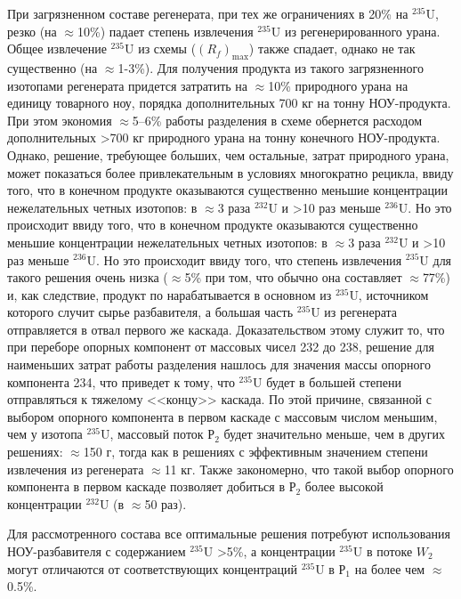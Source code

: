 При загрязненном составе регенерата, при тех же ограничениях в 20\% на $^{235}$U, резко (на $\approx$10\%) падает степень извлечения $^{235}$U из регенерированного урана. Общее извлечение  $^{235}$U из схемы ($(R_f)_\text{max}$) также спадает, однако не так существенно (на $\approx$1-3\%). Для получения продукта из такого загрязненного изотопами регенерата придется затратить на $\approx$10\% природного урана на единицу товарного ноу, порядка дополнительных 700 кг на тонну НОУ-продукта. При этом экономия $\approx$5--6\% работы разделения в схеме обернется расходом дополнительных >700 кг природного урана на тонну конечного НОУ-продукта. Однако, решение, требующее больших, чем остальные, затрат природного урана, может показаться более привлекательным в условиях многократно рецикла, ввиду того, что в конечном продукте оказываются существенно меньшие концентрации нежелательных четных изотопов: в $\approx$3 раза $^{232}$U и >10 раз меньше $^{236}$U. Но это происходит ввиду того, что в конечном продукте оказываются существенно меньшие концентрации нежелательных четных изотопов: в $\approx$3 раза $^{232}$U и >10 раз меньше $^{236}$U. Но это происходит ввиду того, что степень извлечения $^{235}$U для такого решения очень низка ($\approx$5\% при том, что обычно она составляет $\approx$77\%) и, как следствие, продукт по нарабатывается в основном из $^{235}$U, источником которого случит сырье разбавителя, а большая часть $^{235}$U из регенерата отправляется в отвал первого же каскада. Доказательством этому служит то, что при переборе опорных компонент от массовых чисел 232 до 238, решение для наименьших затрат работы разделения нашлось для значения массы опорного компонента 234, что приведет к тому, что $^{235}$U будет в большей степени отправляться к тяжелому <<концу>> каскада. По этой причине, связанной с выбором опорного компонента в первом каскаде с массовым числом меньшим, чем у изотопа $^{235}$U, массовый поток $Р_2$ будет значительно меньше, чем в других решениях: $\approx$150 г, тогда как в решениях с эффективным значением степени извлечения из регенерата $\approx$11 кг. Также закономерно, что такой выбор опорного компонента в первом каскаде позволяет добиться в $Р_2$ более высокой концентрации $^{232}$U (в $\approx$50 раз).

Для рассмотренного состава все оптимальные решения потребуют использования НОУ-разбавителя с содержанием $^{235}$U >5\%, а концентрации $^{235}$U в потоке $W_2$ могут отличаются от соответствующих  концентраций $^{235}$U в $Р_1$ на более чем $\approx$0.5\%.

